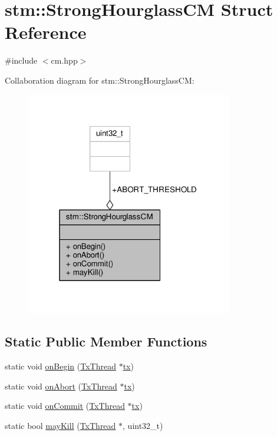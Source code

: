 \hypertarget{structstm_1_1StrongHourglassCM}{\section{stm\-:\-:Strong\-Hourglass\-C\-M Struct Reference}
\label{structstm_1_1StrongHourglassCM}
}


{\ttfamily \#include $<$cm.\-hpp$>$}



Collaboration diagram for stm\-:\-:Strong\-Hourglass\-C\-M\-:
\nopagebreak
\begin{figure}[H]
\begin{center}
\leavevmode
\includegraphics[width=256pt]{structstm_1_1StrongHourglassCM__coll__graph}
\end{center}
\end{figure}
\subsection*{Static Public Member Functions}
\begin{DoxyCompactItemize}
\item 
static void \hyperlink{structstm_1_1StrongHourglassCM_a558fad680abe604244a1c247b0667af8}{on\-Begin} (\hyperlink{structstm_1_1TxThread}{Tx\-Thread} $\ast$\hyperlink{stmskip_8cc_a0f1c58699b83ce5a08bd9ee859250d72}{tx})
\item 
static void \hyperlink{structstm_1_1StrongHourglassCM_a88a1d0eda48d3e22dba6bd4c8a7a4add}{on\-Abort} (\hyperlink{structstm_1_1TxThread}{Tx\-Thread} $\ast$\hyperlink{stmskip_8cc_a0f1c58699b83ce5a08bd9ee859250d72}{tx})
\item 
static void \hyperlink{structstm_1_1StrongHourglassCM_a2960f3c8e24d6cb9f67cb2b485c3f158}{on\-Commit} (\hyperlink{structstm_1_1TxThread}{Tx\-Thread} $\ast$\hyperlink{stmskip_8cc_a0f1c58699b83ce5a08bd9ee859250d72}{tx})
\item 
static bool \hyperlink{structstm_1_1StrongHourglassCM_a8d1566001e3546712a664c1553460353}{may\-Kill} (\hyperlink{structstm_1_1TxThread}{Tx\-Thread} $\ast$, uint32\-\_\-t)
\end{DoxyCompactItemize}
